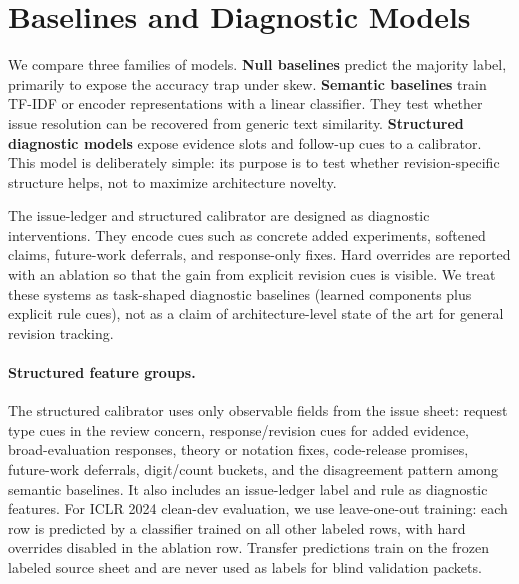 \section{Baselines and Diagnostic Models}

We compare three families of models.
\textbf{Null baselines} predict the majority label, primarily to expose the accuracy trap under skew.
\textbf{Semantic baselines} train TF-IDF or encoder representations with a linear classifier.
They test whether issue resolution can be recovered from generic text similarity.
\textbf{Structured diagnostic models} expose evidence slots and follow-up cues to a calibrator.
This model is deliberately simple: its purpose is to test whether revision-specific structure helps, not to maximize architecture novelty.

The issue-ledger and structured calibrator are designed as diagnostic interventions.
They encode cues such as concrete added experiments, softened claims, future-work deferrals, and response-only fixes.
Hard overrides are reported with an ablation so that the gain from explicit revision cues is visible.
We treat these systems as task-shaped diagnostic baselines (learned components plus explicit rule cues), not as a claim of architecture-level state of the art for general revision tracking.

\paragraph{Structured feature groups.}
The structured calibrator uses only observable fields from the issue sheet: request type cues in the review concern, response/revision cues for added evidence, broad-evaluation responses, theory or notation fixes, code-release promises, future-work deferrals, digit/count buckets, and the disagreement pattern among semantic baselines.
It also includes an issue-ledger label and rule as diagnostic features.
For ICLR 2024 clean-dev evaluation, we use leave-one-out training: each row is predicted by a classifier trained on all other labeled rows, with hard overrides disabled in the ablation row.
Transfer predictions train on the frozen labeled source sheet and are never used as labels for blind validation packets.
